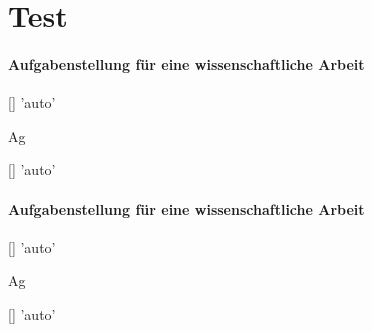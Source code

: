 \documentclass[english,ngerman]{tudscrman3}
\begin{document}
\chapter{Test}

\subsubsection{Aufgabenstellung für eine wissenschaftliche Arbeit}
%

\begin{Declaration}{[]}{%
  'auto'%
}
\begin{Declaration}{}
\printdeclarationlist%
%
\end{Declaration}
\end{Declaration}

%
Ag
%
\begin{Declaration}{[]}{%
  'auto'%
}
\begin{Declaration}{}
\printdeclarationlist%
%
\end{Declaration}
\end{Declaration}
\clearpage

\subsubsection{Aufgabenstellung für eine wissenschaftliche Arbeit}
%
%
\begin{Declaration}{[]}{%
  'auto'%
}
\begin{Declaration}{}
\printdeclarationlist%
%
\end{Declaration}
\end{Declaration}

%
Ag

\begin{Declaration}{[]}{%
  'auto'%
}
\begin{Declaration}{}
\printdeclarationlist%
%
\end{Declaration}
\end{Declaration}
\clearpage
\clearpage
\end{document}
